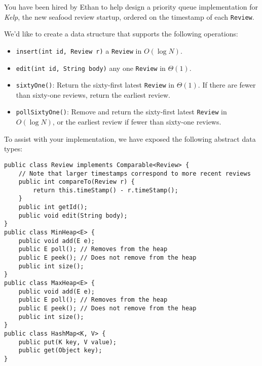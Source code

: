 \question You have been hired by Ethan to help design a priority queue
implementation for \emph{Kelp}, the new seafood review startup, ordered on the
timestamp of each \lstinline$Review$.

We'd like to create a data structure that supports the following operations:

\begin{itemize}
\item \lstinline$insert(int id, Review r)$ a \lstinline$Review$ in $O(\log N)$.
\item \lstinline$edit(int id, String body)$ any one \lstinline$Review$ in
$\Theta(1)$.
\item \lstinline$sixtyOne()$: Return the sixty-first latest \lstinline$Review$
in $\Theta(1)$. If there are fewer than sixty-one reviews, return the earliest review.
\item \lstinline$pollSixtyOne()$: Remove and return the sixty-first latest
\lstinline$Review$ in $O(\log N)$, or the earliest review if fewer than sixty-one reviews.
\end{itemize}

To assist with your implementation, we have exposed the following abstract data types:

\begin{lstlisting}
public class Review implements Comparable<Review> {
    // Note that larger timestamps correspond to more recent reviews
    public int compareTo(Review r) {
        return this.timeStamp() - r.timeStamp();
    }
    public int getId();
    public void edit(String body);
}
public class MinHeap<E> {
    public void add(E e);
    public E poll(); // Removes from the heap
    public E peek(); // Does not remove from the heap
    public int size();
}
public class MaxHeap<E> {
    public void add(E e);
    public E poll(); // Removes from the heap
    public E peek(); // Does not remove from the heap
    public int size();
}
public class HashMap<K, V> {
    public put(K key, V value);
    public get(Object key);
}
\end{lstlisting}

